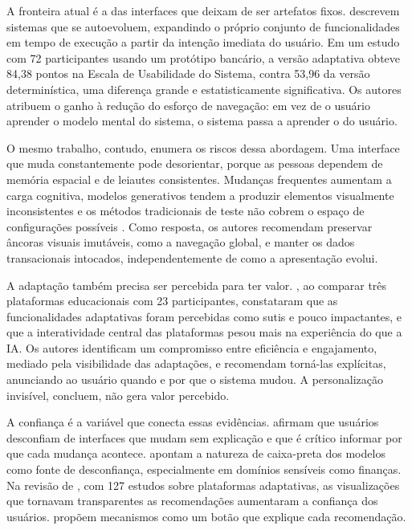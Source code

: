 A fronteira atual é a das interfaces que deixam de ser artefatos fixos.  descrevem sistemas que se autoevoluem, expandindo o próprio conjunto de funcionalidades em tempo de execução a partir da intenção imediata do usuário. Em um estudo com 72 participantes usando um protótipo bancário, a versão adaptativa obteve 84,38 pontos na Escala de Usabilidade do Sistema, contra 53,96 da versão determinística, uma diferença grande e estatisticamente significativa. Os autores atribuem o ganho à redução do esforço de navegação: em vez de o usuário aprender o modelo mental do sistema, o sistema passa a aprender o do usuário.

O mesmo trabalho, contudo, enumera os riscos dessa abordagem. Uma interface que muda constantemente pode desorientar, porque as pessoas dependem de memória espacial e de leiautes consistentes. Mudanças frequentes aumentam a carga cognitiva, modelos generativos tendem a produzir elementos visualmente inconsistentes e os métodos tradicionais de teste não cobrem o espaço de configurações possíveis \cite{arora2025selfevolving}. Como resposta, os autores recomendam preservar âncoras visuais imutáveis, como a navegação global, e manter os dados transacionais intocados, independentemente de como a apresentação evolui.

A adaptação também precisa ser percebida para ter valor. , ao comparar três plataformas educacionais com 23 participantes, constataram que as funcionalidades adaptativas foram percebidas como sutis e pouco impactantes, e que a interatividade central das plataformas pesou mais na experiência do que a IA. Os autores identificam um compromisso entre eficiência e engajamento, mediado pela visibilidade das adaptações, e recomendam torná-las explícitas, anunciando ao usuário quando e por que o sistema mudou. A personalização invisível, concluem, não gera valor percebido.

A confiança é a variável que conecta essas evidências.  afirmam que usuários desconfiam de interfaces que mudam sem explicação e que é crítico informar por que cada mudança acontece.  apontam a natureza de caixa-preta dos modelos como fonte de desconfiança, especialmente em domínios sensíveis como finanças. Na revisão de , com 127 estudos sobre plataformas adaptativas, as visualizações que tornavam transparentes as recomendações aumentaram a confiança dos usuários.  propõem mecanismos como um botão que explique cada recomendação.


